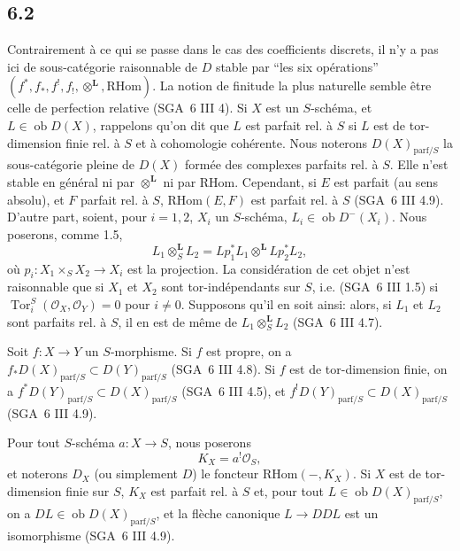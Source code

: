 \documentclass[11pt]{article}
\providecommand{\cO}{\mathcal{O}}
\DeclareMathOperator{\Tor}{Tor}
\providecommand{\RHom}{\mathrm{RHom}}
\providecommand{\RHom}{\mathrm{RHom}}
\begin{document}
\subsection*{6.2}
Contrairement à ce qui se passe dans le cas des coefficients discrets, il n'y a pas ici de sous-catégorie raisonnable de $D$ stable par ``les six opérations'' $(f^*,f_*,f^!,f_!,\otimes^{\mathbf L},\RHom)$. La notion de finitude la plus naturelle semble être celle de perfection relative (SGA~6 III 4). Si $X$ est un $S$-schéma, et $L\in\operatorname{ob}D(X)$, rappelons qu'on dit que $L$ est parfait rel. à $S$ si $L$ est de tor-dimension finie rel. à $S$ et à cohomologie cohérente. Nous noterons $D(X)_{\mathrm{parf}/S}$ la sous-catégorie pleine de $D(X)$ formée des complexes parfaits rel. à $S$. Elle n'est stable en général ni par $\otimes^{\mathbf L}$ ni par $\RHom$. Cependant, si $E$ est parfait (au sens absolu), et $F$ parfait rel. à $S$, $\RHom(E,F)$ est parfait rel. à $S$ (SGA~6 III 4.9). D'autre part, soient, pour $i=1,2$, $X_i$ un $S$-schéma, $L_i\in\operatorname{ob}D^{-}(X_i)$. Nous poserons, comme 1.5,
\[
L_1\otimes_S^{\mathbf L}L_2=Lp_1^*L_1\otimes^{\mathbf L}Lp_2^*L_2,
\]
où $p_i:X_1\times_SX_2\to X_i$ est la projection. La considération de cet objet n'est raisonnable que si $X_1$ et $X_2$ sont tor-indépendants sur $S$, i.e. (SGA~6 III 1.5) si $\Tor_i^S(\cO_X,\cO_Y)=0$ pour $i\ne0$. Supposons qu'il en soit ainsi: alors, si $L_1$ et $L_2$ sont parfaits rel. à $S$, il en est de même de $L_1\otimes_S^{\mathbf L}L_2$ (SGA~6 III 4.7).

Soit $f:X\to Y$ un $S$-morphisme. Si $f$ est propre, on a $f_*D(X)_{\mathrm{parf}/S}\subset D(Y)_{\mathrm{parf}/S}$ (SGA~6 III 4.8). Si $f$ est de tor-dimension finie, on a $f^*D(Y)_{\mathrm{parf}/S}\subset D(X)_{\mathrm{parf}/S}$ (SGA~6 III 4.5), et $f^!D(Y)_{\mathrm{parf}/S}\subset D(X)_{\mathrm{parf}/S}$ (SGA~6 III 4.9).

Pour tout $S$-schéma $a:X\to S$, nous poserons
\begin{equation}
\tag{6.2.1}
K_X=a^!\cO_S,
\end{equation}
et noterons $D_X$ (ou simplement $D$) le foncteur $\RHom(-,K_X)$. Si $X$ est de tor-dimension finie sur $S$, $K_X$ est parfait rel. à $S$ et, pour tout $L\in\operatorname{ob}D(X)_{\mathrm{parf}/S}$, on a $DL\in\operatorname{ob}D(X)_{\mathrm{parf}/S}$, et la flèche canonique $L\to DDL$ est un isomorphisme (SGA~6 III 4.9).
\end{document}

